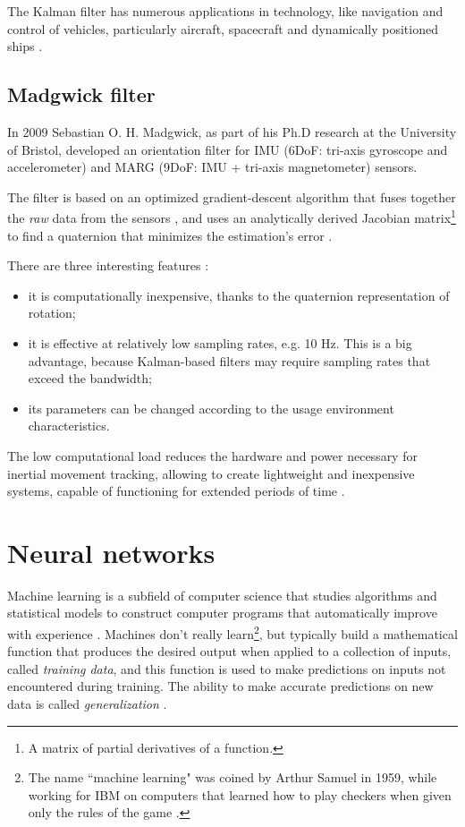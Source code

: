 The Kalman filter has numerous applications in technology, like navigation and control of vehicles, particularly aircraft, spacecraft and dynamically positioned ships \cite{WikipediaKalman}.

\subsection{Madgwick filter} \label{Madgwick filter}
In 2009 Sebastian O. H. Madgwick, as part of his Ph.D research at the University of Bristol, developed an orientation filter for IMU (6DoF: tri-axis gyroscope and accelerometer) and MARG (9DoF: IMU + tri-axis magnetometer) sensors.

The filter is based on an optimized gradient-descent algorithm that fuses together the \textit{raw} data from the sensors \cite{Mad10}, and uses an analytically derived Jacobian matrix\footnote{A matrix of partial derivatives of a function.} to find a quaternion that minimizes the estimation's error \cite{Che12}.
\bigbreak

There are three interesting features \cite{Mad10}:
\begin{itemize}
	\item it is computationally inexpensive, thanks to the quaternion representation of rotation;
	\item it is effective at relatively low sampling rates, e.g. 10 Hz. This is a big advantage, because Kalman-based filters may require sampling rates that exceed the bandwidth;
	\item its parameters can be changed according to the usage environment characteristics.
\end{itemize}

The low computational load reduces the hardware and power necessary for inertial movement tracking, allowing to create lightweight and inexpensive systems, capable of functioning for extended periods of time \cite{Mad11}.

\section{Neural networks}
Machine learning is a subfield of computer science that studies algorithms and statistical models to construct computer programs that automatically improve with experience \cite{Mit97}. Machines don't really learn\footnote{The name ``machine learning" was coined by Arthur Samuel in 1959, while working for IBM on computers that learned how to play checkers when given only the rules of the game \cite{Sam59}.}, but typically build a mathematical function that produces the desired output when applied to a collection of inputs, called \textit{training data}, and this function is used to make predictions on inputs not encountered during training. The ability to make accurate predictions on new data is called \textit{generalization} \cite{Hay08}.
\bigbreak

